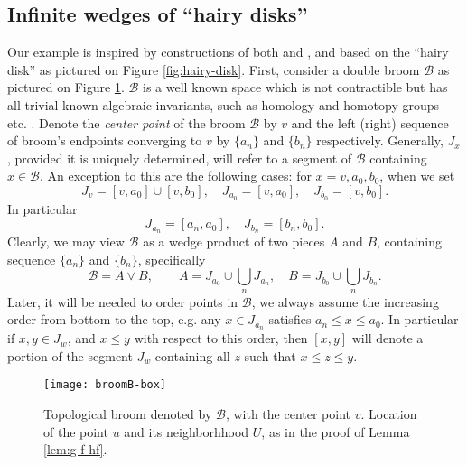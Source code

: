 \documentclass[reqno,12pt]{amsart}
\theoremstyle{ourremark}
\numberwithin{equation}{section}
\numberwithin{theorem}{section}
\begin{document}
\subsection{Infinite wedges of ``hairy disks''}
Our example is inspired by constructions of both \cite{Karimov-Repovs-Rosicki-Zastrow05} and \cite{Stewart58}, and based on the ``hairy disk'' as pictured on Figure \ref{fig:hairy-disk}.
First, consider a double broom $\mathcal{B}$ as pictured on Figure \ref{fig:brooms}.  $\mathcal{B}$ is a well known  space which is not contractible but has all trivial known algebraic invariants, such as homology and homotopy groups etc. \cite[p. 295]{Hilton-Wylie-book}. 
Denote the {\em center point} of the broom $\mathcal{B}$ by $v$ and the left (right) sequence of broom's endpoints converging to $v$ by $\{a_n\}$ and $\{b_n\}$ respectively.  Generally, $J_x$, provided it is uniquely determined, will refer to a segment of $\mathcal{B}$ containing $x\in\mathcal{B}$. An exception to this are the following cases:  for $x=v, a_0, b_0$, when we set
\begin{equation}\label{eq:J-arms}
 J_v=[v,a_0]\cup [v,b_0],\quad  J_{a_0}=[v,a_0],\quad  J_{b_0}=[v,b_0].
\end{equation}
In particular
\begin{equation}\label{eq:J_a-J_b-arms}
 J_{a_n}=[a_n, a_0],\quad J_{b_n}=[b_n, b_0].
\end{equation}
{\noindent} Clearly, we may view $\mathcal{B}$ as a wedge product of two pieces $A$ and $B$, containing sequence $\{a_n\}$ and $\{b_n\}$, specifically
\begin{equation}\label{eq:B-union}
 \mathcal{B}=A\vee B,\qquad A=J_{a_0}\cup\bigcup_{n} J_{a_n},\quad  B=J_{b_0}\cup\bigcup_{n} J_{b_n}.
\end{equation}
{\noindent} Later, it will be needed to order points in  $\mathcal{B}$, we always assume the increasing order from bottom to the top, e.g. any $x\in J_{a_n}$ satisfies $a_n\leq x\leq a_0$. In particular if  $x, y\in J_{w}$, and $x\leq y$ with respect to this order, then $[x,y]$ will denote a portion of the segment $J_{w}$ containing all $z$ such that $x\leq z\leq y$.

\begin{figure}[!ht] 
  \centering  
 \texttt{[image: broomB-box]}
  \caption{Topological broom denoted by $\mathcal{B}$, with the center point $v$. Location of the point $u$ and its neighborhhood $U$, as in the proof of Lemma \ref{lem:g-f-hf}.} \label{fig:brooms} 
\end{figure} 
\end{document}
